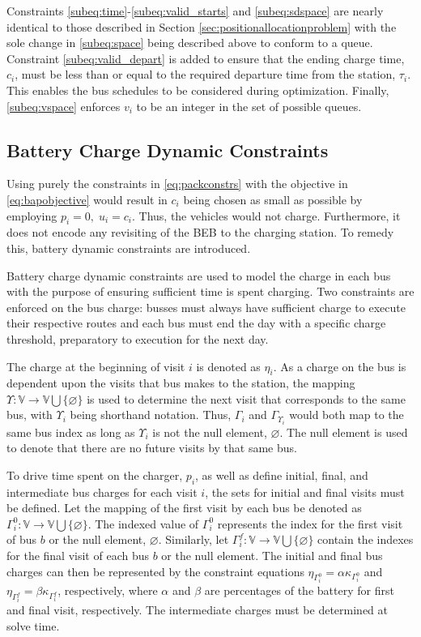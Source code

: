 \documentclass[utf8]{FrontiersinHarvard}
\begin{document}
Constraints \eqref{subeq:time}-\eqref{subeq:valid_starts} and \eqref{subeq:sdspace} are nearly identical to those
described in Section \ref{sec:positionallocationproblem} with the sole change in \eqref{subeq:space} being described
above to conform to a queue. Constraint \eqref{subeq:valid_depart} is added to ensure that the ending charge time,
$c_i$, must be less than or equal to the required departure time from the station, $\tau_i$. This enables the bus schedules
to be considered during optimization. Finally, \eqref{subeq:vspace} enforces $v_i$ to be an integer in the set of
possible queues.

\subsection{Battery Charge Dynamic Constraints}
\label{sec:batt_dynamics}
Using purely the constraints in \eqref{eq:packconstrs} with the objective in \eqref{eq:bapobjective} would result in
$c_i$ being chosen as small as possible by employing $p_i = 0,\; u_i = c_i$. Thus, the vehicles would not charge.
Furthermore, it does not encode any revisiting of the BEB to the charging station. To remedy this, battery dynamic
constraints are introduced.

Battery charge dynamic constraints are used to model the charge in each bus with the purpose of ensuring sufficient time
is spent charging. Two constraints are enforced on the bus charge: busses must always have sufficient charge to execute
their respective routes and each bus must end the day with a specific charge threshold, preparatory to execution for the
next day.

The charge at the beginning of visit $i$ is denoted as $\eta_i$. As a charge on the bus is dependent upon the visits that
bus makes to the station, the mapping $\Upsilon: \mathbb{V} \rightarrow \mathbb{V} \bigcup \{\varnothing\}$ is used to determine the next visit
that corresponds to the same bus, with $\Upsilon_i$ being shorthand notation. Thus, $\Gamma_i$ and $\Gamma_{\Upsilon_i}$ would both map to the
same bus index as long as $\Upsilon_i$ is not the null element, $\varnothing$. The null element is used to denote that there
are no future visits by that same bus.

To drive time spent on the charger, $p_i$, as well as define initial, final, and intermediate bus charges for each visit
$i$, the sets for initial and final visits must be defined. Let the mapping of the first visit by each bus be denoted as
$\Gamma^0_i : \mathbb{V} \rightarrow \mathbb{V} \bigcup \{\varnothing \}$. The indexed value of $\Gamma^0_i$ represents the index for the first
visit of bus $b$ or the null element, $\varnothing$. Similarly, let $\Gamma^f_i : \mathbb{V} \rightarrow \mathbb{V} \bigcup \{\varnothing \}$
contain the indexes for the final visit of each bus $b$ or the null element. The initial and final bus charges can then
be represented by the constraint equations $\eta_{\Gamma^0_i} = \alpha \kappa_{\Gamma^0_i}$ and \(\eta_{\Gamma^f_i} = \beta \kappa_{\Gamma^f_i}\), respectively,
where $\alpha$ and $\beta$ are percentages of the battery for first and final visit, respectively. The intermediate charges must
be determined at solve time.
\end{document}

